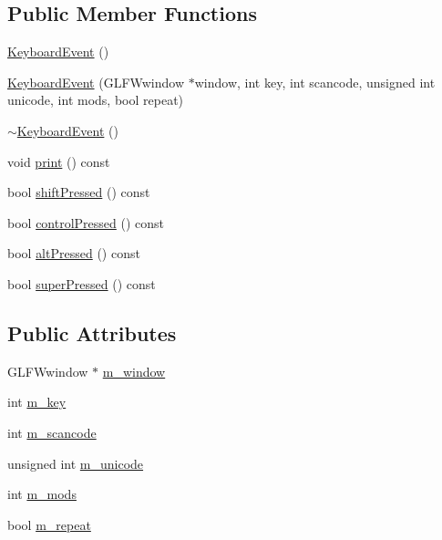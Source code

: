 \subsection*{Public Member Functions}
\begin{DoxyCompactItemize}
\item 
\mbox{\hyperlink{structec_1_1_keyboard_event_a7bec67ef8aff46a11e0472a73e9b6916}{Keyboard\+Event}} ()
\item 
\mbox{\hyperlink{structec_1_1_keyboard_event_a2914ab97f4705f779d630a4c1dbcf4b6}{Keyboard\+Event}} (G\+L\+F\+Wwindow $\ast$window, int key, int scancode, unsigned int unicode, int mods, bool repeat)
\item 
\mbox{\hyperlink{structec_1_1_keyboard_event_a7631a5a8d33373e6b6d739235815dee4}{$\sim$\+Keyboard\+Event}} ()
\item 
void \mbox{\hyperlink{structec_1_1_keyboard_event_a6532e5ce11d3459e28b9e6e0c0ee5d0d}{print}} () const
\item 
bool \mbox{\hyperlink{structec_1_1_keyboard_event_af4ba450f1dadb9b4b28de024c96efbf3}{shift\+Pressed}} () const
\item 
bool \mbox{\hyperlink{structec_1_1_keyboard_event_a3da5135d568d0e15e1f6b3ddd3e3a28d}{control\+Pressed}} () const
\item 
bool \mbox{\hyperlink{structec_1_1_keyboard_event_afa24be439032cd053aca60cba17b4b32}{alt\+Pressed}} () const
\item 
bool \mbox{\hyperlink{structec_1_1_keyboard_event_a86f635631ed297562f5e5c0c0a750f1d}{super\+Pressed}} () const
\end{DoxyCompactItemize}
\subsection*{Public Attributes}
\begin{DoxyCompactItemize}
\item 
G\+L\+F\+Wwindow $\ast$ \mbox{\hyperlink{structec_1_1_keyboard_event_a6de06c21e83612aeca727beedd93ae82}{m\+\_\+window}}
\item 
int \mbox{\hyperlink{structec_1_1_keyboard_event_a3748aaf86e02d8e2f458f5135edc9e3d}{m\+\_\+key}}
\item 
int \mbox{\hyperlink{structec_1_1_keyboard_event_a99de30a0a1504392405bbcfee3debd57}{m\+\_\+scancode}}
\item 
unsigned int \mbox{\hyperlink{structec_1_1_keyboard_event_a530cc03b6d62e8068694756426222909}{m\+\_\+unicode}}
\item 
int \mbox{\hyperlink{structec_1_1_keyboard_event_afd3db99c42980b15922c83d4bd0ccd5c}{m\+\_\+mods}}
\item 
bool \mbox{\hyperlink{structec_1_1_keyboard_event_ad9cc081843fb355f7f1b2a5d7b96b026}{m\+\_\+repeat}}
\end{DoxyCompactItemize}


